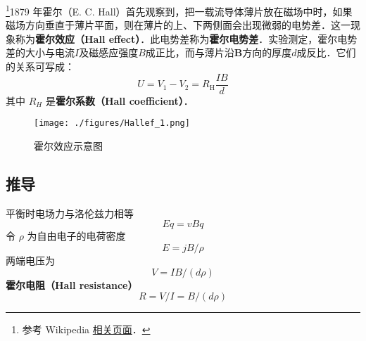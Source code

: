 
\begin{issues}
\issueDraft
\end{issues}

\footnote{参考 Wikipedia \href{https://en.wikipedia.org/wiki/Hall_effect}{相关页面}．}1879 年霍尔（E. C. Hall）首先观察到，把一载流导体薄片放在磁场中时，如果磁场方向垂直于薄片平面，则在薄片的上、下两侧面会出现微弱的电势差．这一现象称为\textbf{霍尔效应（Hall effect）}．此电势差称为\textbf{霍尔电势差}．实验测定，霍尔电势差的大小与电流$I$及磁感应强度$B$成正比，而与薄片沿$\mathbf B$方向的厚度$d$成反比．它们的关系可写成：
\begin{equation}
U = V_{1}-V_{2}=R_{\mathrm{H}} \frac{I B}{d}
\end{equation}
其中 $R_H$ 是\textbf{霍尔系数（Hall coefficient）}．

\begin{figure}[ht]
\centering
\texttt{[image: ./figures/Hallef\_1.png]}
\caption{霍尔效应示意图} \label{Hallef_fig1}
\end{figure}

\subsection{推导}
平衡时电场力与洛伦兹力相等
\begin{equation}
Eq = vBq
\end{equation}
令 $\rho$ 为自由电子的电荷密度
\begin{equation}
E = jB/\rho
\end{equation}
两端电压为
\begin{equation}
V = IB/(d\rho)
\end{equation}
\textbf{霍尔电阻（Hall resistance）}
\begin{equation}
R = V/I = B/(d\rho)
\end{equation}
